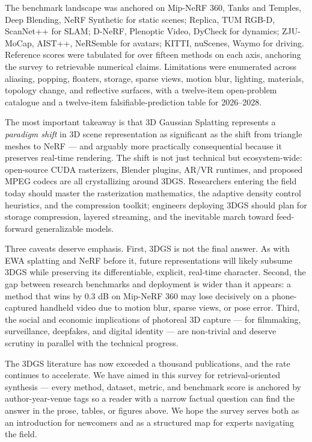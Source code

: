 \documentclass{article}
\begin{document}
The benchmark landscape was anchored on Mip-NeRF 360, Tanks and Temples, Deep Blending, NeRF Synthetic for static scenes; Replica, TUM RGB-D, ScanNet++ for SLAM; D-NeRF, Plenoptic Video, DyCheck for dynamics; ZJU-MoCap, AIST++, NeRSemble for avatars; KITTI, nuScenes, Waymo for driving. Reference scores were tabulated for over fifteen methods on each axis, anchoring the survey to retrievable numerical claims. Limitations were enumerated across aliasing, popping, floaters, storage, sparse views, motion blur, lighting, materials, topology change, and reflective surfaces, with a twelve-item open-problem catalogue and a twelve-item falsifiable-prediction table for 2026--2028.

The most important takeaway is that 3D Gaussian Splatting represents a \emph{paradigm shift} in 3D scene representation as significant as the shift from triangle meshes to NeRF --- and arguably more practically consequential because it preserves real-time rendering. The shift is not just technical but ecosystem-wide: open-source CUDA rasterizers, Blender plugins, AR/VR runtimes, and proposed MPEG codecs are all crystallizing around 3DGS. Researchers entering the field today should master the rasterization mathematics, the adaptive density control heuristics, and the compression toolkit; engineers deploying 3DGS should plan for storage compression, layered streaming, and the inevitable march toward feed-forward generalizable models.

Three caveats deserve emphasis. First, 3DGS is not the final answer. As with EWA splatting and NeRF before it, future representations will likely subsume 3DGS while preserving its differentiable, explicit, real-time character. Second, the gap between research benchmarks and deployment is wider than it appears: a method that wins by \(0.3\) dB on Mip-NeRF 360 may lose decisively on a phone-captured handheld video due to motion blur, sparse views, or pose error. Third, the social and economic implications of photoreal 3D capture --- for filmmaking, surveillance, deepfakes, and digital identity --- are non-trivial and deserve scrutiny in parallel with the technical progress.

The 3DGS literature has now exceeded a thousand publications, and the rate continues to accelerate. We have aimed in this survey for retrieval-oriented synthesis --- every method, dataset, metric, and benchmark score is anchored by author-year-venue tags so a reader with a narrow factual question can find the answer in the prose, tables, or figures above. We hope the survey serves both as an introduction for newcomers and as a structured map for experts navigating the field.
\end{document}
